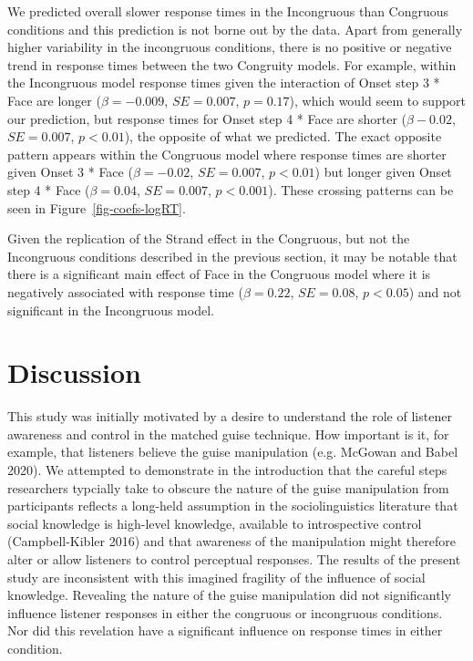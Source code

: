 \documentclass[
  letterpaper,
  DIV=11,
  numbers=noendperiod]{scrartcl}
\begin{document}
We predicted overall slower response times in the Incongruous than
Congruous conditions and this prediction is not borne out by the data.
Apart from generally higher variability in the incongruous conditions,
there is no positive or negative trend in response times between the two
Congruity models. For example, within the Incongruous model response
times given the interaction of Onset step 3 * Face are longer
(\(β=-0.009\), \(SE=0.007\), \(p = 0.17\)), which would seem to support
our prediction, but response times for Onset step 4 * Face are shorter
(\(β-0.02\), \(SE=0.007\), \(p < 0.01\)), the opposite of what we
predicted. The exact opposite pattern appears within the Congruous model
where response times are shorter given Onset 3 * Face (\(β=-0.02\),
\(SE=0.007\), \(p < 0.01\)) but longer given Onset step 4 * Face
(\(β=0.04\), \(SE=0.007\), \(p < 0.001\)). These crossing patterns can
be seen in Figure~\ref{fig-coefs-logRT}.

Given the replication of the Strand effect in the Congruous, but not the
Incongruous conditions described in the previous section, it may be
notable that there is a significant main effect of Face in the Congruous
model where it is negatively associated with response time (\(β=0.22\),
\(SE=0.08\), \(p < 0.05\)) and not significant in the Incongruous model.

\section{Discussion}\label{discussion}

This study was initially motivated by a desire to understand the role of
listener awareness and control in the matched guise technique. How
important is it, for example, that listeners believe the guise
manipulation (e.g. McGowan and Babel 2020). We attempted to demonstrate
in the introduction that the careful steps researchers typcially take to
obscure the nature of the guise manipulation from participants reflects
a long-held assumption in the sociolinguistics literature that social
knowledge is high-level knowledge, available to introspective control
(Campbell-Kibler 2016) and that awareness of the manipulation might
therefore alter or allow listeners to control perceptual responses. The
results of the present study are inconsistent with this imagined
fragility of the influence of social knowledge. Revealing the nature of
the guise manipulation did not significantly influence listener
responses in either the congruous or incongruous conditions. Nor did
this revelation have a significant influence on response times in either
condition.
\end{document}
